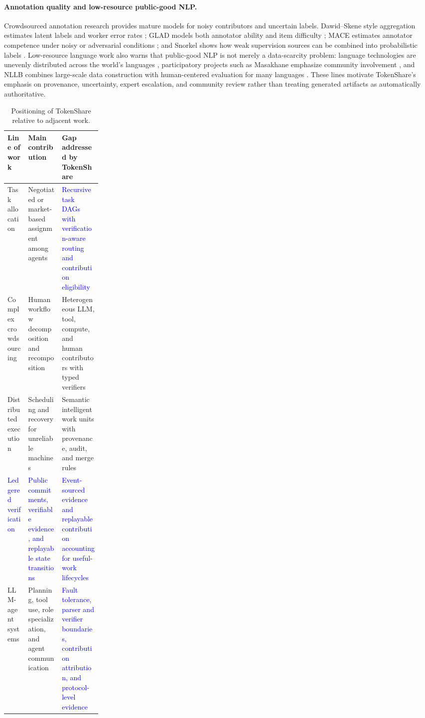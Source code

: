 \documentclass{article}
\theoremstyle{plain}
\begin{document}
\paragraph{Annotation quality and low-resource public-good NLP.}
Crowdsourced annotation research provides mature models for noisy contributors and uncertain labels. Dawid--Skene style aggregation estimates latent labels and worker error rates \citep{dawid1979maximum}; GLAD models both annotator ability and item difficulty \citep{whitehill2009glad}; MACE estimates annotator competence under noisy or adversarial conditions \citep{hovy2013mace}; and Snorkel shows how weak supervision sources can be combined into probabilistic labels \citep{ratner2017snorkel}. Low-resource language work also warns that public-good NLP is not merely a data-scarcity problem: language technologies are unevenly distributed across the world's languages \citep{joshi2020state}, participatory projects such as Masakhane emphasize community involvement \citep{nekoto2020participatory}, and NLLB combines large-scale data construction with human-centered evaluation for many languages \citep{nllb2022}. These lines motivate TokenShare's emphasis on provenance, uncertainty, expert escalation, and community review rather than treating generated artifacts as automatically authoritative.





\begin{table}[t]
\centering
\small
\caption{Positioning of TokenShare relative to adjacent work.}
\label{tab:related_positioning}
\begin{tabularx}{\linewidth}{p{0.22\linewidth} X X}
\toprule
Line of work & Main contribution & Gap addressed by TokenShare \\
\midrule
Task allocation & Negotiated or market-based assignment among agents & \textcolor{blue}{Recursive task DAGs with verification-aware routing and contribution eligibility} \\
Complex crowdsourcing & Human workflow decomposition and recomposition & Heterogeneous LLM, tool, compute, and human contributors with typed verifiers \\
Distributed execution & Scheduling and recovery for unreliable machines & Semantic intelligent work units with provenance, audit, and merge rules \\
\textcolor{blue}{Ledgered verification} & \textcolor{blue}{Public commitments, verifiable evidence, and replayable state transitions} & \textcolor{blue}{Event-sourced evidence and replayable contribution accounting for useful-work lifecycles} \\
LLM-agent systems & Planning, tool use, role specialization, and agent communication & \textcolor{blue}{Fault tolerance, parser and verifier boundaries, contribution attribution, and protocol-level evidence} \\
\bottomrule
\end{tabularx}
\end{table}
\end{document}
